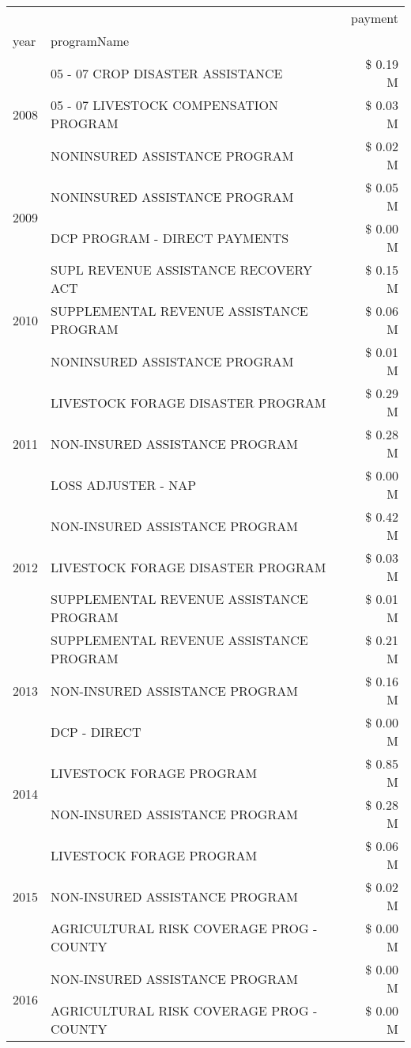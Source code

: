 \begin{tabular}{llr}
\toprule
 &  & payment \\
year & programName &  \\
\midrule
\multirow[t]{3}{*}{2008} & 05 - 07 CROP DISASTER ASSISTANCE & \$ 0.19 M \\
 & 05 - 07 LIVESTOCK COMPENSATION PROGRAM & \$ 0.03 M \\
 & NONINSURED ASSISTANCE PROGRAM & \$ 0.02 M \\
\cline{1-3}
\multirow[t]{2}{*}{2009} & NONINSURED ASSISTANCE PROGRAM & \$ 0.05 M \\
 & DCP PROGRAM - DIRECT PAYMENTS & \$ 0.00 M \\
\cline{1-3}
\multirow[t]{3}{*}{2010} & SUPL REVENUE ASSISTANCE RECOVERY ACT & \$ 0.15 M \\
 & SUPPLEMENTAL REVENUE ASSISTANCE PROGRAM & \$ 0.06 M \\
 & NONINSURED ASSISTANCE PROGRAM & \$ 0.01 M \\
\cline{1-3}
\multirow[t]{3}{*}{2011} & LIVESTOCK FORAGE DISASTER PROGRAM & \$ 0.29 M \\
 & NON-INSURED ASSISTANCE PROGRAM & \$ 0.28 M \\
 & LOSS ADJUSTER - NAP & \$ 0.00 M \\
\cline{1-3}
\multirow[t]{3}{*}{2012} & NON-INSURED ASSISTANCE PROGRAM & \$ 0.42 M \\
 & LIVESTOCK FORAGE DISASTER PROGRAM & \$ 0.03 M \\
 & SUPPLEMENTAL REVENUE ASSISTANCE PROGRAM & \$ 0.01 M \\
\cline{1-3}
\multirow[t]{3}{*}{2013} & SUPPLEMENTAL REVENUE ASSISTANCE PROGRAM & \$ 0.21 M \\
 & NON-INSURED ASSISTANCE PROGRAM & \$ 0.16 M \\
 & DCP - DIRECT & \$ 0.00 M \\
\cline{1-3}
\multirow[t]{2}{*}{2014} & LIVESTOCK FORAGE PROGRAM & \$ 0.85 M \\
 & NON-INSURED ASSISTANCE PROGRAM & \$ 0.28 M \\
\cline{1-3}
\multirow[t]{3}{*}{2015} & LIVESTOCK FORAGE PROGRAM & \$ 0.06 M \\
 & NON-INSURED ASSISTANCE PROGRAM & \$ 0.02 M \\
 & AGRICULTURAL RISK COVERAGE PROG - COUNTY & \$ 0.00 M \\
\cline{1-3}
\multirow[t]{2}{*}{2016} & NON-INSURED ASSISTANCE PROGRAM                & \$ 0.00 M \\
 & AGRICULTURAL RISK COVERAGE PROG - COUNTY      & \$ 0.00 M \\

\end{tabular}
